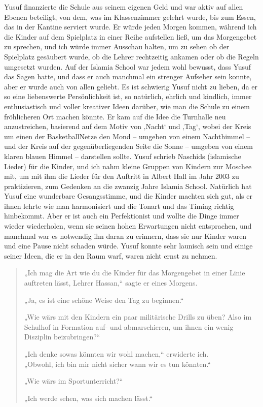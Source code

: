 \documentclass[12pt]{memoir}
\begin{document}
Yusuf finanzierte die Schule aus seinem eigenen Geld
und war aktiv auf allen Ebenen beteiligt,
von dem, was im Klassenzimmer gelehrt wurde, bis zum Essen,
das in der Kantine serviert wurde.
Er würde jeden Morgen kommen, während ich die Kinder
auf dem Spielplatz in einer Reihe aufstellen ließ,
um das Morgengebet zu sprechen,
und ich würde immer Ausschau halten,
um zu sehen ob der Spielplatz gesäubert wurde,
ob die Lehrer rechtzeitig ankamen oder ob die Regeln umgesetzt wurden.
Auf der Islamia School war jedem wohl bewusst, dass Yusuf das Sagen hatte,
und dass er auch manchmal ein strenger Aufseher sein konnte,
aber er wurde auch von allen geliebt.
Es ist schwierig Yusuf nicht zu lieben,
da er so eine liebenswerte Persönlichkeit ist,
so natürlich, ehrlich und kindlich,
immer enthusiastisch und voller kreativer Ideen darüber,
wie man die Schule zu einem fröhlicheren Ort machen könnte.
Er kam auf die Idee die Turnhalle neu anzustreichen,
basierend auf dem Motiv von ‚Nacht‘ und ‚Tag‘,
wobei der Kreis um einen der Basketball\–Netze
den Mond – umgeben von einem Nachthimmel –
und der Kreis auf der gegenüberliegenden Seite
die Sonne – umgeben von einem klaren blauen Himmel – darstellen sollte.
Yusuf schrieb Naschids (islamische Lieder) für die Kinder,
und ich nahm kleine Gruppen von Kindern zur Moschee mit,
um mit ihm die Lieder für den Auftritt
in Albert Hall im Jahr 2003 zu praktizieren,
zum Gedenken an die zwanzig Jahre Islamia School.
Natürlich hat Yusuf eine wunderbare Gesangsstimme,
und die Kinder machten sich gut,
als er ihnen lehrte wie man harmonisiert und
die Tonart und das Timing richtig hinbekommt.
Aber er ist auch ein Perfektionist und wollte
die Dinge immer wieder wiederholen,
wenn sie seinen hohen Erwartungen nicht entsprachen,
und manchmal war es notwendig ihn daran zu erinnern,
dass sie nur Kinder waren und eine Pause nicht schaden würde.
Yusuf konnte sehr launisch sein und einige seiner Ideen,
die er in den Raum warf, waren nicht ernst zu nehmen.

\begin{quote}
„Ich mag die Art wie du die Kinder für das Morgengebet
in einer Linie auftreten lässt, Lehrer Hassan,“ sagte er eines Morgens.

„Ja, es ist eine schöne Weise den Tag zu beginnen.“

„Wie wärs mit den Kindern ein paar militärische Drills zu üben?
Also im Schulhof in Formation auf- und abmarschieren,
um ihnen ein wenig Disziplin beizubringen?“

„Ich denke sowas könnten wir wohl machen,“ erwiderte ich.\\
„Obwohl, ich bin mir nicht sicher wann wir es tun könnten.“

„Wie wärs im Sportunterricht?“

„Ich werde sehen, was sich machen lässt.“
\end{quote}
\end{document}
